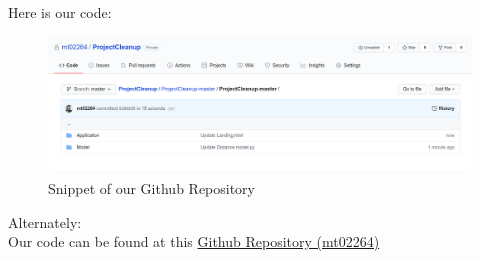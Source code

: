 Here is our code:

\begin{figure}[!hb]
    \centering
    \includegraphics[scale=0.35]{images/ProjectsCleanup.png}
    \caption{Snippet of our Github Repository}
    \label{fig:GithubProject}
\end{figure}


Alternately:\\
Our code can be found at this  \href{https://github.com/mt02264/ProjectCleanup}{Github Repository (mt02264)}

